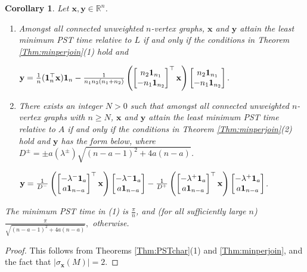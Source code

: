 \documentclass[11pt]{article}
\newtheorem{corollary}[theorem]{Corollary}
\newcommand{\ones}{{\bf{1}}}
\newcommand{\bx}{\mathbf x}
\newcommand{\by}{\mathbf y}
\def\R{\mathbb{R}}
\begin{document}
\begin{corollary}
\label{Cor:minpst}
Let $\bx,\by\in \R^n$.
\begin{enumerate}
\item Amongst all connected unweighted $n$-vertex graphs, $\bx$ and $\by$ attain the least minimum PST time relative to $L$ if and only if the conditions in Theorem \ref{Thm:minperjoin}(1) hold and
\begin{center}
$\by=\frac{1}{n}(\ones_{n}^\top \bx)\ones_{n}-\frac{1}{n_1n_2(n_1+n_2)}\left(\begin{bmatrix}
n_2\ones_{n_1} \\ -n_1\ones_{n_2}
\end{bmatrix}^\top\bx\right)\begin{bmatrix}
n_2\ones_{n_1} \\ -n_1\ones_{n_2}
\end{bmatrix}.$        
\end{center}
\item There exists an integer $N>0$ such that amongst all connected unweighted $n$-vertex graphs with $n\geq N$, $\bx$ and $\by$ attain the least minimum PST time relative to $A$ if and only if the conditions in Theorem \ref{Thm:minperjoin}(2) hold and $\by$ has the form below, where $D^{\pm}=\pm a(\lambda^{\pm })\sqrt{(n-a-1)^2+4a(n-a)}$.
\begin{center}
$\by=\frac{1}{D^-}\left(\begin{bmatrix}
-\lambda^-\ones_{a} \\ a\ones_{n-a}
\end{bmatrix}^\top\bx\right)\begin{bmatrix}
-\lambda^-\ones_{a} \\ a\ones_{n-a}
\end{bmatrix}-\frac{1}{D^+}\left(\begin{bmatrix}
-\lambda^+\ones_{a} \\ a\ones_{n-a}
\end{bmatrix}^\top\bx\right)\begin{bmatrix}
-\lambda^+\ones_{a} \\ a\ones_{n-a}
\end{bmatrix}$.
\end{center}
\end{enumerate} 
The minimum PST time in (1) is $\frac{\pi}{n}$, and (for all sufficiently large $n$) $\frac{\pi}{\sqrt{(n-a-1)^2+4a(n-a)}},$ otherwise.
\end{corollary}

\begin{proof}
This follows from Theorems \ref{Thm:PSTchar}(1) and \ref{Thm:minperjoin}, and the fact that $|\sigma_{\bx}(M)|=2$.
\end{proof}
\end{document}

